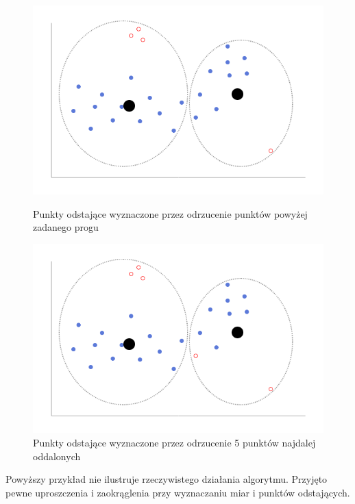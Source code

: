 \documentclass[eng,printmode]{mgr}
\begin{document}
\begin{figure}[H]
  \begin{center}
    \includegraphics[scale=0.5]{kmean_dist_2}
    \caption{Punkty odstające wyznaczone przez odrzucenie punktów powyżej
     zadanego progu}
     \label{fig:kmean_dist_2}
\end{center}

\begin{center}
  \includegraphics[scale=0.5]{kmean_dist_3}
  \caption{Punkty odstające wyznaczone przez odrzucenie 5 punktów najdalej oddalonych}
  \label{fig:kmean_dist_3}
  \end{center}
\end{figure}
Powyższy przykład nie ilustruje rzeczywistego działania algorytmu. Przyjęto pewne uproszczenia i zaokrąglenia przy wyznaczaniu miar i punktów odstających.
\end{document}
